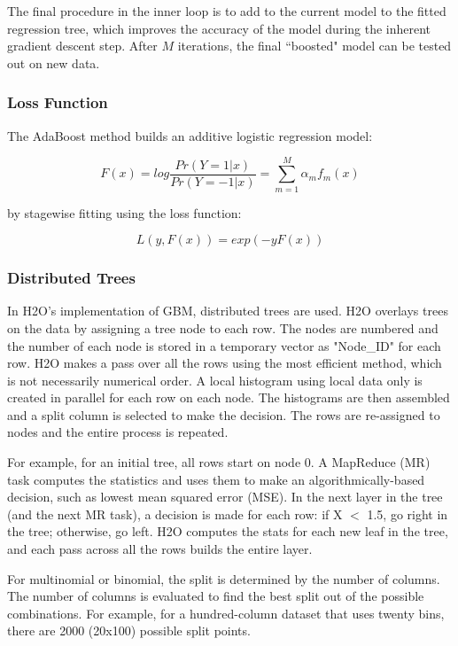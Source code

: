 \documentclass[11pt]{article}
\begin{document}
{\\
\\
The final procedure in the inner loop is to add to the current model to the fitted regression tree, which improves the accuracy of the model during the inherent gradient descent step. After $M$ iterations, the final ``boosted" model can be tested out on new data.

\subsubsection{Loss Function}

The AdaBoost method builds an additive logistic regression model:

$${F(x) = log}\frac{Pr(Y = 1|x)}{Pr(Y = -1|x)} = \sum_{m=1}^{M} \alpha_m f_m (x) $$

by stagewise fitting using the loss function: 

$$L(y, F(x)) = exp(-y  F (x)) $$



\subsubsection{Distributed Trees}

In H2O's implementation of GBM, distributed trees are used. H2O overlays trees on the data by assigning a tree node to each row. The nodes are numbered and the number of each node is stored in a temporary vector as "Node_ID" for each row. H2O makes a pass over all the rows using the most efficient method, which is not necessarily numerical order. A local histogram using local data only is created in parallel for each row on each node. The histograms are then assembled and a split column is selected to make the decision. The rows are re-assigned to nodes and the entire process is repeated. 

For example, for an initial tree, all rows start on node 0. A MapReduce (MR) task computes the statistics and uses them to make an algorithmically-based decision, such as lowest mean squared error (MSE). In the next layer in the tree (and the next MR task), a decision is made for each row: if X $<$ 1.5, go right in the tree; otherwise, go left. H2O computes the stats for each new leaf in the tree, and each pass across all the rows builds the entire layer. 

For multinomial or binomial, the split is determined by the number of columns. The number of columns is evaluated to find the best split out of the possible combinations. For example, for a hundred-column dataset that uses twenty bins, there are 2000 (20x100) possible split points. 

}
\end{document}
